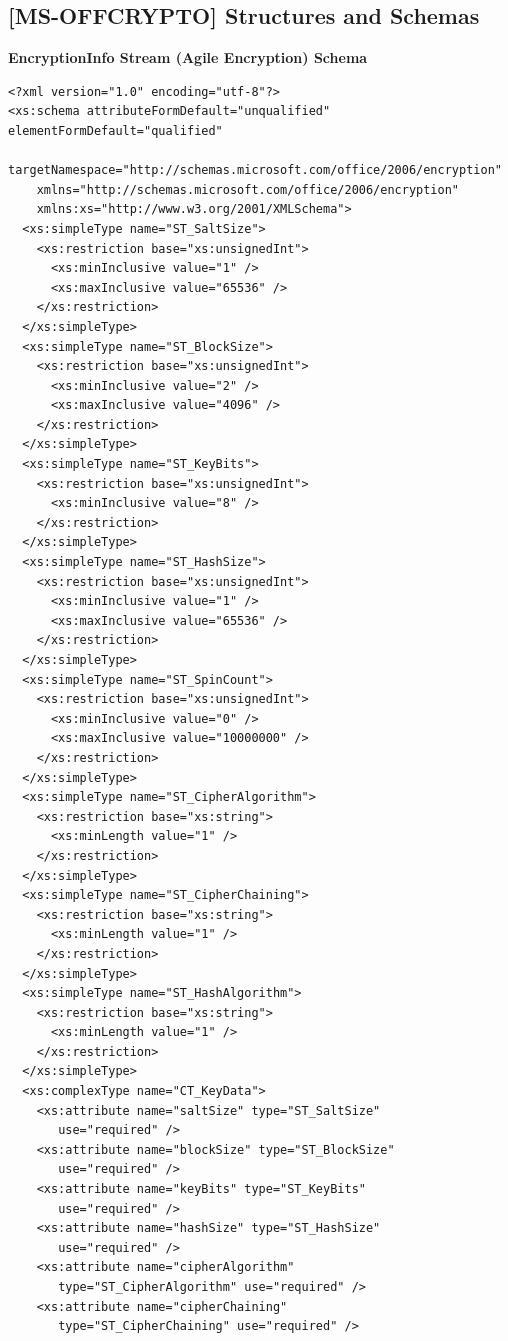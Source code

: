 \documentclass[11pt,oneside]{fithesis2}
\begin{document}
\begin{appendix}
	\section{[MS-OFFCRYPTO] Structures and Schemas}
	\textbf{EncryptionInfo Stream (Agile Encryption) Schema}\label{ei_agile_stream}
	\begin{lstlisting}
<?xml version="1.0" encoding="utf-8"?>
<xs:schema attributeFormDefault="unqualified" elementFormDefault="qualified"
    targetNamespace="http://schemas.microsoft.com/office/2006/encryption"
    xmlns="http://schemas.microsoft.com/office/2006/encryption"
    xmlns:xs="http://www.w3.org/2001/XMLSchema">
  <xs:simpleType name="ST_SaltSize">
    <xs:restriction base="xs:unsignedInt">
      <xs:minInclusive value="1" />
      <xs:maxInclusive value="65536" />
    </xs:restriction> 
  </xs:simpleType> 
  <xs:simpleType name="ST_BlockSize">
    <xs:restriction base="xs:unsignedInt">
      <xs:minInclusive value="2" /> 
      <xs:maxInclusive value="4096" />
    </xs:restriction> 
  </xs:simpleType> 
  <xs:simpleType name="ST_KeyBits"> 
    <xs:restriction base="xs:unsignedInt"> 
      <xs:minInclusive value="8" /> 
    </xs:restriction> 
  </xs:simpleType> 
  <xs:simpleType name="ST_HashSize"> 
    <xs:restriction base="xs:unsignedInt">
      <xs:minInclusive value="1" /> 
      <xs:maxInclusive value="65536" /> 
    </xs:restriction> 
  </xs:simpleType> 
  <xs:simpleType name="ST_SpinCount"> 
    <xs:restriction base="xs:unsignedInt"> 
      <xs:minInclusive value="0" /> 
      <xs:maxInclusive value="10000000" /> 
    </xs:restriction>
  </xs:simpleType> 
  <xs:simpleType name="ST_CipherAlgorithm"> 
    <xs:restriction base="xs:string"> 
      <xs:minLength value="1" /> 
    </xs:restriction> 
  </xs:simpleType>
  <xs:simpleType name="ST_CipherChaining"> 
    <xs:restriction base="xs:string"> 
      <xs:minLength value="1" /> 
    </xs:restriction> 
  </xs:simpleType> 
  <xs:simpleType name="ST_HashAlgorithm"> 
    <xs:restriction base="xs:string"> 
      <xs:minLength value="1" /> 
    </xs:restriction> 
  </xs:simpleType>
  <xs:complexType name="CT_KeyData"> 
    <xs:attribute name="saltSize" type="ST_SaltSize" 
       use="required" /> 
    <xs:attribute name="blockSize" type="ST_BlockSize"
       use="required" /> 
    <xs:attribute name="keyBits" type="ST_KeyBits"
       use="required" /> 
    <xs:attribute name="hashSize" type="ST_HashSize"
       use="required" /> 
    <xs:attribute name="cipherAlgorithm" 
       type="ST_CipherAlgorithm" use="required" /> 
    <xs:attribute name="cipherChaining"
       type="ST_CipherChaining" use="required" /> 

\end{lstlisting}
\end{appendix}
\end{document}
